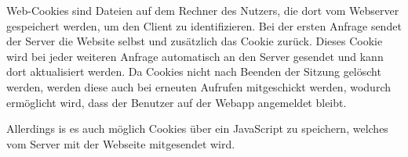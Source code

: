 
Web-Cookies sind Dateien auf dem Rechner des Nutzers, die dort vom Webserver gespeichert werden, um den Client zu identifizieren. Bei der ersten Anfrage sendet der Server die Website selbst und zusätzlich das Cookie zurück. Dieses Cookie wird bei jeder weiteren Anfrage automatisch an den Server gesendet und kann dort aktualisiert werden. Da Cookies nicht nach Beenden der Sitzung gelöscht werden, werden diese auch bei erneuten Aufrufen mitgeschickt werden, wodurch ermöglicht wird, dass der Benutzer auf der Webapp angemeldet bleibt. 

Allerdings is es auch möglich Cookies über ein JavaScript zu speichern, welches vom Server mit der Webseite mitgesendet wird. 
\cite{wikiCookies}
